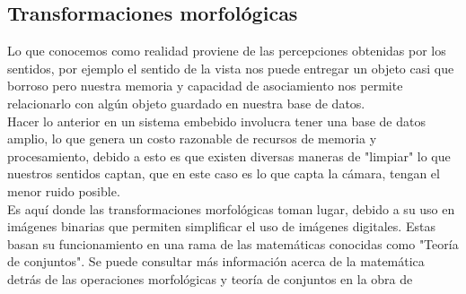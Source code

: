 \subsection{Transformaciones morfológicas}
Lo que conocemos como realidad proviene de las percepciones obtenidas por los sentidos, por ejemplo el sentido de la vista
nos puede entregar un objeto casi que borroso pero nuestra memoria y capacidad de asociamiento nos permite relacionarlo con
algún objeto guardado en nuestra base de datos.\\
Hacer lo anterior en un sistema embebido involucra tener una base de datos amplio, lo que genera un costo razonable de recursos
de memoria y procesamiento, debido a esto es que existen diversas maneras de "limpiar" lo que nuestros sentidos captan, que en
este caso es lo que capta la cámara, tengan el menor ruido posible.\\
Es aquí donde las transformaciones morfológicas toman lugar, debido a su uso en imágenes binarias que permiten simplificar
el uso de imágenes digitales. Estas basan su funcionamiento en una rama de las matemáticas conocidas como "Teoría de conjuntos".
Se puede consultar más información acerca de la matemática detrás de las operaciones morfológicas y teoría de conjuntos en la
obra de \cite{Book:Serra1984} %
